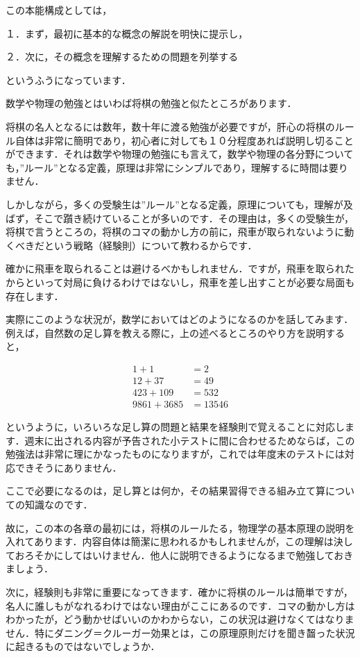 \documentclass[
  b4paperpaper,
  xelatex,ja=standard]{bxjsbook}
\begin{document}
この本能構成としては，

１．まず，最初に基本的な概念の解説を明快に提示し，

２．次に，その概念を理解するための問題を列挙する

というふうになっています．

数学や物理の勉強とはいわば将棋の勉強と似たところがあります．

将棋の名人となるには数年，数十年に渡る勉強が必要ですが，肝心の将棋のルール自体は非常に簡明であり，初心者に対しても１０分程度あれば説明し切ることができます．それは数学や物理の勉強にも言えて，数学や物理の各分野についても，''ルール''となる定義，原理は非常にシンプルであり，理解するに時間は要りません．

しかしながら，多くの受験生は''ルール''となる定義，原理についても，理解が及ばず，そこで躓き続けていることが多いのです．その理由は，多くの受験生が，将棋で言うところの，将棋のコマの動かし方の前に，飛車が取られないように動くべきだという戦略（経験則）について教わるからです．

確かに飛車を取られることは避けるべかもしれません．ですが，飛車を取られたからといって対局に負けるわけではないし，飛車を差し出すことが必要な局面も存在します．

実際にこのような状況が，数学においてはどのようになるのかを話してみます．例えば，自然数の足し算を教える際に，上の述べるところのやり方を説明すると，

\begin{align*}
1+1&=2\\
12+37&=49\\
423+109&=532\\
9861+3685&=13546
\end{align*}

というように，いろいろな足し算の問題と結果を経験則で覚えることに対応します．週末に出される内容が予告された小テストに間に合わせるためならば，この勉強法は非常に理にかなったものになりますが，これでは年度末のテストには対応できそうにありません．

ここで必要になるのは，足し算とは何か，その結果習得できる組み立て算についての知識なのです．

故に，この本の各章の最初には，将棋のルールたる，物理学の基本原理の説明を入れてあります．内容自体は簡潔に思われるかもしれませんが，この理解は決しておろそかにしてはいけません．他人に説明できるようになるまで勉強しておきましょう．

次に，経験則も非常に重要になってきます．確かに将棋のルールは簡単ですが，名人に誰しもがなれるわけではない理由がここにあるのです．コマの動かし方はわかったが，どう動かせばいいのかわからない，この状況は避けなくてはなりません．特にダニング＝クルーガー効果とは，この原理原則だけを聞き齧った状況に起きるものではないでしょうか．
\end{document}
